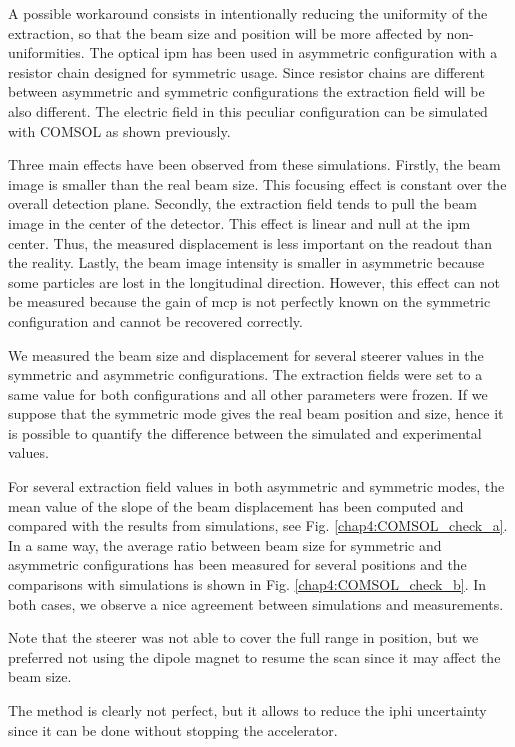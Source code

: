 \begin{refsection}
  A possible workaround consists in intentionally reducing the uniformity of the extraction, so that the beam size and position will be more affected by non-uniformities. The optical \acrshort{ipm} has been used in asymmetric configuration with a resistor chain designed for symmetric usage. Since resistor chains are different between asymmetric and symmetric configurations the extraction field will be also different. The electric field in this peculiar configuration can be simulated with COMSOL as shown previously.

  Three main effects have been observed from these simulations. Firstly, the beam image is smaller than the real beam size. This focusing effect is constant over the overall detection plane. Secondly, the extraction field tends to pull the beam image in the center of the detector. This effect is linear and null at the \acrshort{ipm} center. Thus, the measured displacement is less important on the readout than the reality. Lastly, the beam image intensity is smaller in asymmetric because some particles are lost in the longitudinal direction. However, this effect can not be measured because the gain of \acrshort{mcp} is not perfectly known on the symmetric configuration and cannot be recovered correctly.

  We measured the beam size and displacement for several steerer values in the symmetric and asymmetric configurations.
  The extraction fields were set to a same value for both configurations and all other parameters were frozen. If we suppose that the symmetric mode gives the real beam position and size, hence it is possible to quantify the difference between the simulated and experimental values.
  

  For several extraction field values in both asymmetric and symmetric modes, the mean value of the slope of the beam displacement has been computed and compared with the results from simulations, see Fig. \ref{chap4:COMSOL_check_a}. In a same way, the average ratio between beam size for symmetric and asymmetric configurations has been measured for several positions and the comparisons with simulations is shown in Fig. \ref{chap4:COMSOL_check_b}. In both cases, we observe a nice agreement between simulations and measurements.

  Note that the steerer was not able to cover the full range in position, but we preferred not using the dipole magnet to resume the scan since it may affect the beam size.

  The method is clearly not perfect, but it allows to reduce the \acrshort{iphi} uncertainty since it can be done without stopping the accelerator.


\end{refsection}
